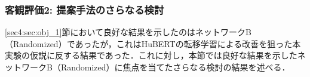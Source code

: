 \begin{table}[bt]
    \centering
    \caption{最適な$\lossWeightHubDisc$における手法ごとの比較}
    \label{sec4:tab:obj_method_comp}
    \begin{center}
        \renewcommand{\arraystretch}{1.0} %
        \setlength{\tabcolsep}{8pt}      %
    \end{center}
\end{table}

\subsubsection{客観評価2: 提案手法のさらなる検討}
\label{sec4:sec:obj_2}
\ref{sec4:sec:obj_1}節において良好な結果を示したのはネットワークB（Randomized）であったが，これはHuBERTの転移学習による改善を狙った本実験の仮説に反する結果であった．これに対し，本節では良好な結果を示したネットワークB（Randomized）に焦点を当てたさらなる検討の結果を述べる．

